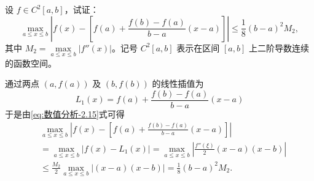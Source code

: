 \documentclass[../../main.tex]{subfiles}%
\begin{document}
\begin{example}
设 $f \in C^2[a, b]$，试证： 
\[
\max_{a \leqslant x \leqslant b} \left| f(x) - \left[ f(a) + \frac{f(b) - f(a)}{b - a}(x - a) \right] \right| \leqslant \frac{1}{8}(b - a)^2 M_2,
\]
其中 $M_2 = \max\limits_{a \leqslant x \leqslant b} |f''(x)|$。记号 $C^2[a, b]$ 表示在区间 $[a, b]$ 上二阶导数连续的函数空间。
\end{example}
\begin{solution}

通过两点 $(a, f(a))$ 及 $(b, f(b))$ 的线性插值为 
\[
L_1(x) = f(a) + \frac{f(b) - f(a)}{b - a}(x - a)
\]
于是由\eqref{eq:数值分析-2.15}式可得
\begin{align*}
&\max_{a \leqslant x \leqslant b} \left| f(x) - \left[ f(a) + \frac{f(b) - f(a)}{b - a}(x - a) \right] \right| \\
&= \max_{a \leqslant x \leqslant b} |f(x) - L_1(x)| = \max_{a \leqslant x \leqslant b} \left| \frac{f''(\xi)}{2}(x - a)(x - b) \right| \\
&\leqslant \frac{M_2}{2} \max_{a \leqslant x \leqslant b} |(x - a)(x - b)| = \frac{1}{8}(b - a)^2 M_2.
\end{align*}

\end{solution}
\end{document}
